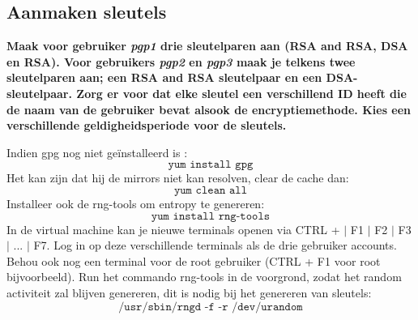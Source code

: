 \documentclass{report}
\begin{document}
\subsection{Aanmaken sleutels}
\textbf{Maak voor gebruiker \textit{pgp1} drie sleutelparen aan (RSA and RSA, DSA en RSA). Voor gebruikers \textit{pgp2} en \textit{pgp3} maak je telkens twee sleutelparen aan; een RSA and RSA sleutelpaar en een DSA-sleutelpaar. Zorg er voor dat elke sleutel een verschillend ID heeft die de naam van de gebruiker bevat alsook de encryptiemethode. Kies een verschillende geldigheidsperiode voor de sleutels.}


	 Indien gpg nog niet geïnstalleerd is :
	$$\texttt{yum install gpg}$$
	Het kan zijn dat hij de mirrors niet kan resolven, clear de cache dan:
	$$\texttt{yum clean all}$$
	Installeer ook de rng-tools om entropy te genereren:
	$$\texttt{yum install rng-tools}$$
	In de virtual machine kan je nieuwe terminals openen via CTRL + $\vert$ F1 $\vert$ F2 $\vert$ F3 $\vert$ ... $\vert$ F7. Log in op deze verschillende terminals als de drie gebruiker accounts. Behou ook nog een terminal voor de root gebruiker (CTRL + F1 voor root bijvoorbeeld). Run het commando rng-tools in de voorgrond, zodat het random activiteit zal blijven genereren, dit is nodig bij het genereren van sleutels:
	$$\texttt{/usr/sbin/rngd -f -r /dev/urandom}$$
	
\end{document}
